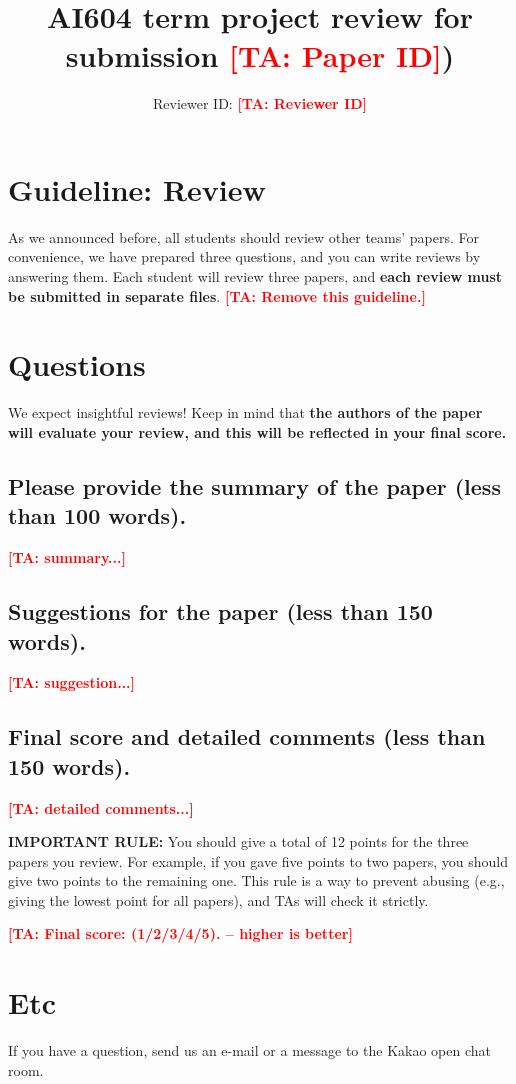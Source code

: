 \documentclass[final]{cvpr}
\newcommand{\todoc}[2]{{\textcolor{#1} {\textbf{[#2]}}}}
\newcommand{\todored}[1]{\todoc{red}{\textbf{#1}}}
\newcommand{\TA}[1]{\todored{TA: #1}}
\begin{document}
\title{AI604 term project review for submission \TA{Paper ID})}

\author{Reviewer ID: \TA{Reviewer ID}
}

\maketitle

\section{Guideline: Review}

As we announced before, all students should review other teams' papers. For convenience, we have prepared three questions, and you can write reviews by answering them. Each student will review three papers, and \textbf{each review must be submitted in separate files}. \TA{Remove this guideline.} 

\section{Questions}

We expect insightful reviews! Keep in mind that \textbf{the authors of the paper will evaluate your review, and this will be reflected in your final score.}

\subsection{Please provide the summary of the paper (less than 100 words).}

\TA{summary...}

\subsection{Suggestions for the paper (less than 150 words).}

\TA{suggestion...}

\subsection{Final score and detailed comments (less than 150 words).}

\TA{detailed comments...}

\textbf{IMPORTANT RULE:} You should give a total of 12 points for the three papers you review. For example, if you gave five points to two papers, you should give two points to the remaining one. This rule is a way to prevent abusing (e.g., giving the lowest point for all papers), and TAs will check it strictly.

\TA{Final score: (1/2/3/4/5). -- higher is better}

\section{Etc}

If you have a question, send us an e-mail or a message to the Kakao open chat room.

% 
% 
\end{document}
